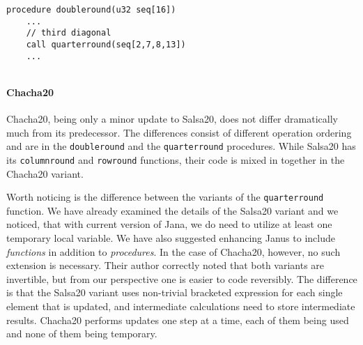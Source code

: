 \documentclass[a4paper,10pt,openright]{memoir}
\newcommand{\term}[1]{\textit{#1}}
\newcommand{\code}[1]{\texttt{#1}}
\begin{document}


\begin{lstlisting}[language=Janus]
procedure doubleround(u32 seq[16])
	...
	// third diagonal
	call quarterround(seq[2,7,8,13])
	...
\end{lstlisting}


\begin{lstlisting}[language=Janus]
\end{lstlisting}

\paragraph{Chacha20}

Chacha20, being only a minor update to Salsa20, does not differ 
dramatically much from its predecessor. The differences consist of 
different operation ordering and are in the \code{doubleround} and the 
\code{quarterround} procedures. While Salsa20 has its 
\code{columnround} and \code{rowround} functions, their code is mixed 
in together in the Chacha20 variant.

Worth noticing is the difference between the variants of the 
\code{quarterround} function. We have already examined the details of 
the Salsa20 variant and we noticed, that with current version of Jana, 
we do need to utilize at least one temporary local variable. We have 
also suggested enhancing Janus to include \term{functions} in addition 
to \term{procedures}. In the case of Chacha20, however, no such 
extension is necessary. Their author correctly noted that both variants 
are invertible, but from our perspective one is easier to code 
reversibly. The difference is that the Salsa20 variant uses non-trivial 
bracketed expression for each single element that is updated, and 
intermediate calculations need to store intermediate results. Chacha20 
performs updates one step at a time, each of them being used and none 
of them being temporary.
\end{document}

